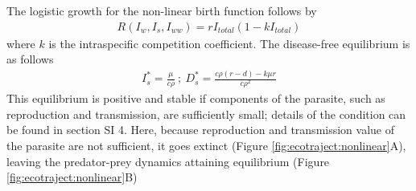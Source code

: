 \documentclass[a4paper]{scrartcl}
\begin{document}
The logistic growth for the non-linear birth function follows by 
%
\begin{align*}
R(I_w, I_s,I_{ww}) = r I_{total} (1 - k I_{total})
\end{align*}
%
where $k$ is the intraspecific competition coefficient. 
The disease-free equilibrium is as follows
%
\begin{align*}
I_s^* = \frac{\mu}{c \rho } \ ;\  D_s^* = \frac{c \rho  (r-d) - k \mu  r}{c \rho ^2}
\end{align*}
%
This equilibrium is positive and stable if components of the parasite, such as reproduction and transmission, are sufficiently small; details of the condition can be found in section SI 4. 
Here, because reproduction and transmission value of the parasite are not sufficient, it goes extinct (Figure \ref{fig:ecotraject:nonlinear}A), leaving the predator-prey dynamics attaining equilibrium (Figure \ref{fig:ecotraject:nonlinear}B)
\end{document}
